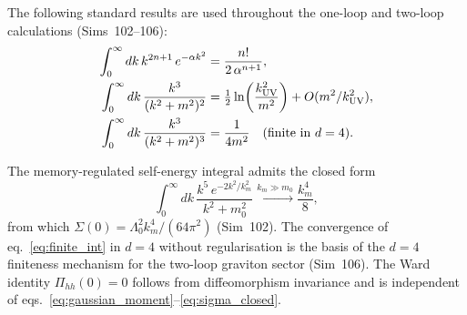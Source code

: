 \documentclass[12pt,a4paper]{article}
\begin{document}
The following standard results are used throughout the one-loop and two-loop
calculations (Sims~102--106):
\begin{align}
\int_0^\infty dk\,k^{2n+1}\,e^{-\alpha k^2}
&= \frac{n!}{2\,\alpha^{n+1}}, \label{eq:gaussian_moment}\\
\int_0^\infty dk\,\frac{k^3}{(k^2+m^2)^2}
&= \tfrac{1}{2}\ln\!\left(\frac{k_{\rm UV}^2}{m^2}\right)
   + O(m^2/k_{\rm UV}^2), \label{eq:log_int}\\
\int_0^\infty dk\,\frac{k^3}{(k^2+m^2)^3}
&= \frac{1}{4m^2}\quad\text{(finite in }d=4\text{)}. \label{eq:finite_int}
\end{align}

The memory-regulated self-energy integral admits the closed form
\begin{equation}
\int_0^\infty dk\,\frac{k^5\,e^{-2k^2/k_m^2}}{k^2+m_0^2}
\xrightarrow{k_m\gg m_0}
\frac{k_m^4}{8},
\label{eq:sigma_closed}
\end{equation}
from which $\Sigma(0)=\Lambda_0^2 k_m^4/(64\pi^2)$ (Sim~102).  The
convergence of eq.~\eqref{eq:finite_int} in $d=4$ without regularisation
is the basis of the $d=4$ finiteness mechanism for the two-loop graviton
sector (Sim~106).  The Ward identity $\Pi_{hh}(0)=0$ follows from
diffeomorphism invariance and is independent of eqs.~\eqref{eq:gaussian_moment}--\eqref{eq:sigma_closed}.
\end{document}
